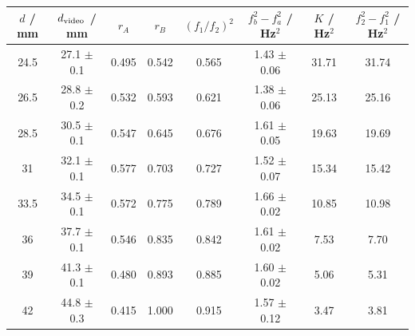 \begin{tabular}{@{}cccccccc@{}}
\toprule
$d$ / mm & $d_{\rm video}$ / mm & $r_A$ & $r_B$ & $(f_1/f_2)^2$ & $f_b^2-f_a^2$ / Hz$^2$ & $K$ / Hz$^2$ & $f_2^2-f_1^2$ / Hz$^2$ \\
\midrule
24.5 & 27.1 $\pm$ 0.1 & 0.495 & 0.542 & 0.565 & 1.43 $\pm$ 0.06 & 31.71 & 31.74 \\
26.5 & 28.8 $\pm$ 0.2 & 0.532 & 0.593 & 0.621 & 1.38 $\pm$ 0.06 & 25.13 & 25.16 \\
28.5 & 30.5 $\pm$ 0.1 & 0.547 & 0.645 & 0.676 & 1.61 $\pm$ 0.05 & 19.63 & 19.69 \\
31 & 32.1 $\pm$ 0.1 & 0.577 & 0.703 & 0.727 & 1.52 $\pm$ 0.07 & 15.34 & 15.42 \\
33.5 & 34.5 $\pm$ 0.1 & 0.572 & 0.775 & 0.789 & 1.66 $\pm$ 0.02 & 10.85 & 10.98 \\
36 & 37.7 $\pm$ 0.1 & 0.546 & 0.835 & 0.842 & 1.61 $\pm$ 0.02 & 7.53 & 7.70 \\
39 & 41.3 $\pm$ 0.1 & 0.480 & 0.893 & 0.885 & 1.60 $\pm$ 0.02 & 5.06 & 5.31 \\
42 & 44.8 $\pm$ 0.3 & 0.415 & 1.000 & 0.915 & 1.57 $\pm$ 0.12 & 3.47 & 3.81 \\
\bottomrule
\end{tabular}